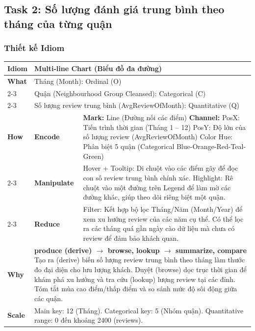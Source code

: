 \subsection{Task 2: Số lượng đánh giá trung bình theo tháng của từng quận}

\subsubsection{Thiết kế Idiom}

\begin{table}[H]
\centering
\renewcommand{\arraystretch}{1.1}
\begin{tabularx}{\textwidth}{|l|l|X|}
\hline
\textbf{Idiom} & \multicolumn{2}{l|}{\textbf{Multi-line Chart (Biểu đồ đa đường)}} \\ \hline
\textbf{What}
& \multicolumn{2}{X|}{Tháng (Month): Ordinal (O)} \\ \cline{2-3}
& \multicolumn{2}{X|}{Quận (Neighbourhood Group Cleansed): Categorical (C)} \\ \cline{2-3}
& \multicolumn{2}{X|}{Số lượng review trung bình (AvgReviewOfMonth): Quantitative (Q)} \\ \hline
\textbf{How}
& \textbf{Encode} &
\textbf{Mark:} Line (Đường nối các điểm) \newline
\textbf{Channel:} \newline
\hspace*{1em} PosX: Tiến trình thời gian (Tháng 1 -- 12) \newline
\hspace*{1em} PosY: Độ lớn của số lượng review (AvgReviewOfMonth) \newline
\hspace*{1em} Color Hue: Phân biệt 5 quận (Categorical Blue-Orange-Red-Teal-Green) \\ \cline{2-3}
& \textbf{Manipulate} &
Hover + Tooltip: Di chuột vào các điểm gãy để đọc con số review trung bình chính xác. \newline
Highlight: Rê chuột vào một đường trên Legend để làm mờ các đường khác, giúp theo dõi riêng biệt một quận. \\ \cline{2-3}
& \textbf{Reduce} &
Filter: Kết hợp bộ lọc Tháng/Năm (Month/Year) để xem xu hướng review của các năm cụ thể. Có thể lọc ra các tháng quá gần ngày cào dữ liệu mà chưa có review để đảm bảo khách quan. \\ \hline
\textbf{Why} & \multicolumn{2}{X|}{
\textbf{produce (derive) $\rightarrow$ browse, lookup $\rightarrow$ summarize, compare} \newline
Tạo ra (derive) biến số lượng review trung bình theo tháng làm thước đo đại diện cho lưu lượng khách. Duyệt (browse) dọc trục thời gian để khám phá xu hướng và tra cứu (lookup) lượng review tại các đỉnh. Tóm tắt mùa cao điểm/thấp điểm và so sánh mức độ sôi động giữa các quận.
} \\ \hline
\textbf{Scale} & \multicolumn{2}{X|}{
Main key: 12 (Tháng). \newline
Categorical key: 5 (Nhóm quận). \newline
Quantitative range: 0 đến khoảng 2400 (reviews).
} \\ \hline
\end{tabularx}
\end{table}

